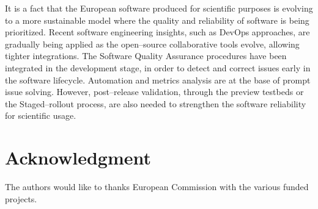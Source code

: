 \documentclass[journal]{IEEEtran}
\begin{document}
It is a fact that the European software produced for scientific purposes is
evolving to a more sustainable model where the quality and reliability of
software is being prioritized. Recent software engineering insights, such as
DevOps approaches, are gradually being applied as the open--source collaborative tools
evolve, allowing tighter integrations. The Software Quality
Assurance procedures have been integrated in the development stage, in order to
detect and correct issues early in the software lifecycle. Automation and
metrics analysis are at the base of prompt issue solving. However, post--release
validation, through the preview testbeds or the Staged--rollout process, are
also needed to strengthen the software reliability for scientific usage.

\section*{Acknowledgment}

The authors would like to thanks European Commission with the various funded
projects.
\end{document}
